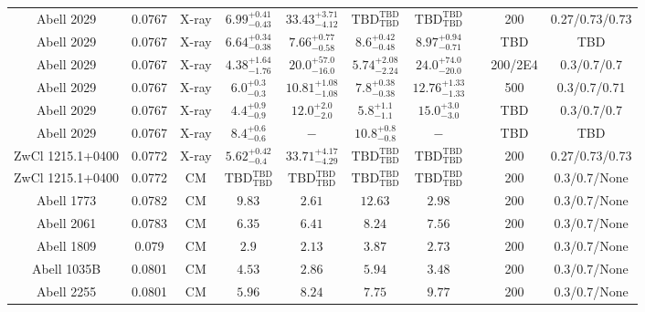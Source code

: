 \begin{table}
\begin{tabular}{cccccccccc}
Abell 2029 & 0.0767 & X-ray & ${6.99}^{+0.41}_{-0.43}$ & ${33.43}^{+3.71}_{-4.12}$ & ${\mathrm{TBD}}^{\mathrm{TBD}}_{\mathrm{TBD}}$ & ${\mathrm{TBD}}^{\mathrm{TBD}}_{\mathrm{TBD}}$ & \citet{BA14.1} & 200 & 0.27/0.73/0.73 \\
Abell 2029 & 0.0767 & X-ray & ${6.64}^{+0.34}_{-0.38}$ & ${7.66}^{+0.77}_{-0.58}$ & ${8.6}^{+0.42}_{-0.48}$ & ${8.97}^{+0.94}_{-0.71}$ & \citet{SC06.1} & TBD & TBD \\
Abell 2029 & 0.0767 & X-ray & ${4.38}^{+1.64}_{-1.76}$ & ${20.0}^{+57.0}_{-16.0}$ & ${5.74}^{+2.08}_{-2.24}$ & ${24.0}^{+74.0}_{-20.0}$ & \citet{VO06.1} & 200/2E4 & 0.3/0.7/0.7 \\
Abell 2029 & 0.0767 & X-ray & ${6.0}^{+0.3}_{-0.3}$ & ${10.81}^{+1.08}_{-1.08}$ & ${7.8}^{+0.38}_{-0.38}$ & ${12.76}^{+1.33}_{-1.33}$ & \citet{VI05.1} & 500 & 0.3/0.7/0.71 \\
Abell 2029 & 0.0767 & X-ray & ${4.4}^{+0.9}_{-0.9}$ & ${12.0}^{+2.0}_{-2.0}$ & ${5.8}^{+1.1}_{-1.1}$ & ${15.0}^{+3.0}_{-3.0}$ & \citet{LE03.1} & TBD & 0.3/0.7/0.7 \\
Abell 2029 & 0.0767 & X-ray & ${8.4}^{+0.6}_{-0.6}$ & ${-}^{}_{}$ & ${10.8}^{+0.8}_{-0.8}$ & ${-}^{}_{}$ & \citet{XU01.1} & TBD & TBD \\
ZwCl 1215.1+0400 & 0.0772 & X-ray & ${5.62}^{+0.42}_{-0.4}$ & ${33.71}^{+4.17}_{-4.29}$ & ${\mathrm{TBD}}^{\mathrm{TBD}}_{\mathrm{TBD}}$ & ${\mathrm{TBD}}^{\mathrm{TBD}}_{\mathrm{TBD}}$ & \citet{BA14.1} & 200 & 0.27/0.73/0.73 \\
ZwCl 1215.1+0400 & 0.0772 & CM & ${\mathrm{TBD}}^{\mathrm{TBD}}_{\mathrm{TBD}}$ & ${\mathrm{TBD}}^{\mathrm{TBD}}_{\mathrm{TBD}}$ & ${\mathrm{TBD}}^{\mathrm{TBD}}_{\mathrm{TBD}}$ & ${\mathrm{TBD}}^{\mathrm{TBD}}_{\mathrm{TBD}}$ & \citet{RI06.1} & 200 & 0.3/0.7/None \\
Abell 1773 & 0.0782 & CM & ${9.83}^{}_{}$ & ${2.61}^{}_{}$ & ${12.63}^{}_{}$ & ${2.98}^{}_{}$ & \citet{RI06.1} & 200 & 0.3/0.7/None \\
Abell 2061 & 0.0783 & CM & ${6.35}^{}_{}$ & ${6.41}^{}_{}$ & ${8.24}^{}_{}$ & ${7.56}^{}_{}$ & \citet{RI06.1} & 200 & 0.3/0.7/None \\
Abell 1809 & 0.079 & CM & ${2.9}^{}_{}$ & ${2.13}^{}_{}$ & ${3.87}^{}_{}$ & ${2.73}^{}_{}$ & \citet{RI06.1} & 200 & 0.3/0.7/None \\
Abell 1035B & 0.0801 & CM & ${4.53}^{}_{}$ & ${2.86}^{}_{}$ & ${5.94}^{}_{}$ & ${3.48}^{}_{}$ & \citet{RI06.1} & 200 & 0.3/0.7/None \\
Abell 2255 & 0.0801 & CM & ${5.96}^{}_{}$ & ${8.24}^{}_{}$ & ${7.75}^{}_{}$ & ${9.77}^{}_{}$ & \citet{RI06.1} & 200 & 0.3/0.7/None \\

\end{tabular}
\end{table}

